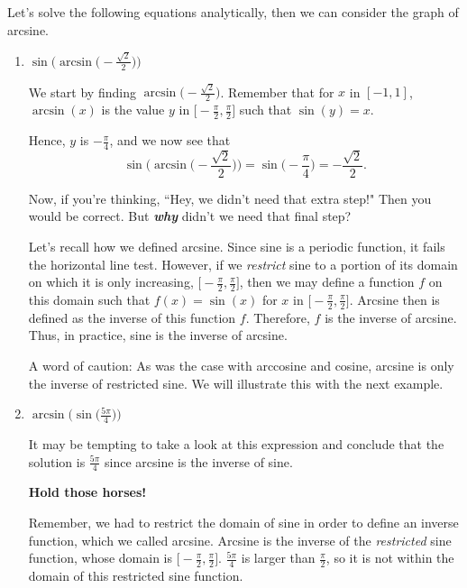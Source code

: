 \documentclass{ximera}
\begin{document}
\begin{example}
Let's solve the following equations analytically, then we can consider the graph of arcsine.

\begin{enumerate}
\item $\sin\!\Big(\!\arcsin\!\Big(\!-\frac{\sqrt{2}}{2}\Big)\Big)$\\
\begin{explanation}
We start by finding $\arcsin\!\Big(\!\!-\!\frac{\sqrt{2}}{2}\Big)$. Remember that for $x$ in $[-1,1]$, $\arcsin(x)$ is the value $y$ in $\Big[-\frac{\pi}{2},\frac{\pi}{2}\Big]$ such that $\sin(y) = x$. 

Hence, $y$ is $-\frac{\pi}{4}$, and we now see that 
\begin{equation*}
\sin\!\Big(\!\arcsin\!\Big(\!\!-\!\frac{\sqrt{2}}{2}\Big)\Big) = \sin\Big(\!-\frac{\pi}{4}\Big) = -\frac{\sqrt{2}}{2}.
\end{equation*}

Now, if you're thinking, ``Hey, we didn't need that extra step!" Then you would be correct. But \textbf{\textit{why}} didn't we need that final step?

Let's recall how we defined arcsine. Since sine is a periodic function, it fails the horizontal line test. However, if we {\it restrict} sine to a portion of its domain on which it is only increasing, $\Big[-\frac{\pi}{2},\frac{\pi}{2}\Big]$, then we may define a function $f$ on this domain such that $f(x) = \sin(x)$ for $x$ in $\Big[-\frac{\pi}{2},\frac{\pi}{2}\Big]$. Arcsine then is defined as the inverse of this function $f$. Therefore, $f$ is the inverse of arcsine. 
Thus, in practice, sine is the inverse of arcsine. 

A word of caution: As was the case with arccosine and cosine, arcsine is only the inverse of restricted sine. We will illustrate this with the next example.
\end{explanation}


\item $\arcsin\!\Big(\sin\!\Big(\frac{5\pi}{4}\Big)\Big)$

\begin{explanation}
It may be tempting to take a look at this expression and conclude that the solution is $\frac{5\pi}{4}$ since arcsine is the inverse of sine. 

{\bf Hold those horses! }

Remember, we had to restrict the domain of sine in order to define an inverse function, which we called arcsine. Arcsine is the inverse of the {\it restricted} sine function, whose domain is $\Big[\!-\frac{\pi}{2},\frac{\pi}{2}\Big]$. $\frac{5\pi}{4}$ is larger than $\frac{\pi}{2}$, so it is not within the domain of this restricted sine function. 


\end{explanation}
\end{enumerate}
\end{example}
\end{document}

